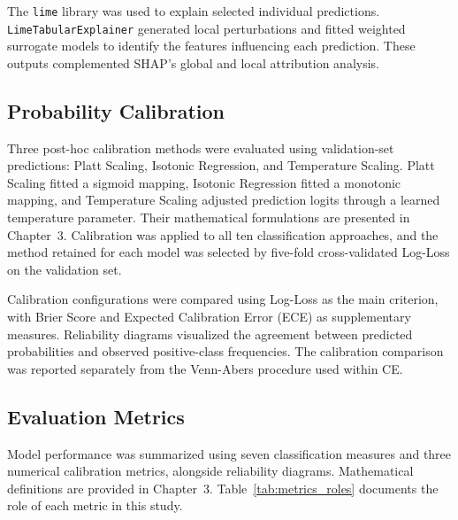 The \texttt{lime} library was used to explain selected individual predictions. \texttt{LimeTabularExplainer} generated local perturbations and fitted weighted surrogate models to identify the features influencing each prediction. These outputs complemented SHAP's global and local attribution analysis.

\subsection{Probability Calibration}

Three post-hoc calibration methods were evaluated using validation-set predictions: Platt Scaling, Isotonic Regression, and Temperature Scaling. Platt Scaling fitted a sigmoid mapping, Isotonic Regression fitted a monotonic mapping, and Temperature Scaling adjusted prediction logits through a learned temperature parameter. Their mathematical formulations are presented in Chapter~3. Calibration was applied to all ten classification approaches, and the method retained for each model was selected by five-fold cross-validated Log-Loss on the validation set.

Calibration configurations were compared using Log-Loss as the main criterion, with Brier Score and Expected Calibration Error (ECE) as supplementary measures. Reliability diagrams visualized the agreement between predicted probabilities and observed positive-class frequencies. The calibration comparison was reported separately from the Venn-Abers procedure used within CE.

\subsection{Evaluation Metrics}

Model performance was summarized using seven classification measures and three numerical calibration metrics, alongside reliability diagrams. Mathematical definitions are provided in Chapter~3. Table~\ref{tab:metrics_roles} documents the role of each metric in this study.

